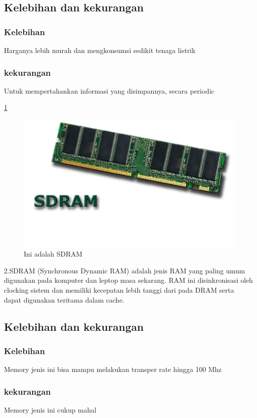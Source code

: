   \subsection{Kelebihan dan kekurangan}
    \subsubsection{Kelebihan}
    \-Harganya lebih murah dan mengkonsumsi sedikit tenaga listrik
    \subsubsection{kekurangan}
    \-Untuk mempertahankan informasi yang disimpannya, secara periodic
    
\ref{SDRAM}
  \begin{figure}[ht]
  \centerline{\includegraphics[width=1\textwidth]{figures/SDRAM.jpg}}
  \caption{Ini adalah SDRAM}
  \label{SDRAM}
  \end{figure}
2.SDRAM (Synchronous Dynamic RAM) adalah jenis RAM yang paling umum digunakan pada komputer dan leptop masa sekarang. RAM ini disinkronisasi oleh clocking sistem dan memiliki kecepatan lebih tanggi dari pada DRAM serta dapat digunakan teritama dalam cache.
    \subsection{Kelebihan dan kekurangan}
    \subsubsection{Kelebihan}
    \-Memory jenis ini bisa mampu melakukan transper rate hingga 100 Mhz
    \subsubsection{kekurangan}
    \-Memory jenis ini cukup mahal

